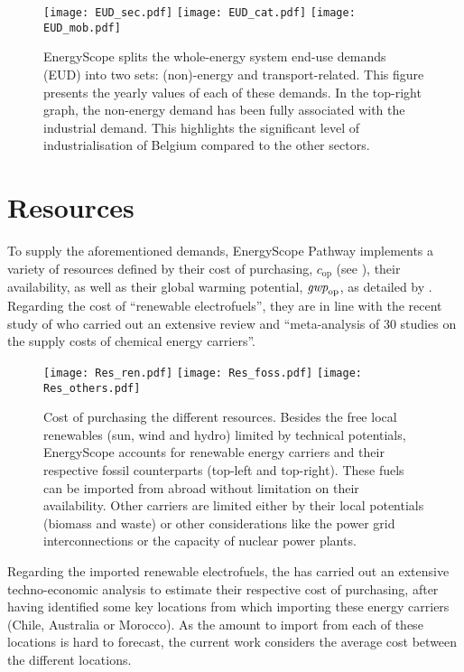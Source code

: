 \begin{figure}[htbp!]
\centering
\texttt{[image: EUD\_sec.pdf]}
\texttt{[image: EUD\_cat.pdf]}
\texttt{[image: EUD\_mob.pdf]}
\caption{EnergyScope splits the whole-energy system end-use demands (EUD) into two sets: (non)-energy and transport-related. This figure presents the yearly values of each of these demands. In the top-right graph, the non-energy demand has been fully associated with the industrial demand. This highlights the significant level of industrialisation of Belgium compared to the other sectors.}
\label{fig:cs_demands}
\end{figure}


\section{Resources}
\label{sec:cs:resources}
To supply the aforementioned demands, EnergyScope Pathway implements a variety of resources defined by their cost of purchasing, $\mathit{c}_{\mathrm{op}}$ (see ), their availability, as well as their global warming potential, $\emph{gwp}_{\mathrm{op}}$, as detailed by \citet{limpens2024pathway}. Regarding the cost of ``renewable electrofuels'', they are in line with the recent study of \citet{genge2023supply} who carried out an extensive review and ``meta-analysis \cite{grant2009typology,page2021prisma} of 30 studies on the supply costs of chemical energy carriers''. 

\begin{figure}[htbp!]
\centering
\texttt{[image: Res\_ren.pdf]}
\texttt{[image: Res\_foss.pdf]}
\texttt{[image: Res\_others.pdf]}
\caption{Cost of purchasing the different resources. Besides the free local renewables (\ie sun, wind and hydro) limited by technical potentials, EnergyScope accounts for renewable energy carriers and their respective fossil counterparts (top-left and top-right). These fuels can be imported from abroad without limitation on their availability. Other carriers are limited either by their local potentials (\ie biomass and waste) or other considerations like the power grid interconnections or the capacity of nuclear power plants.}
\label{fig:cs_resources_cost}
\end{figure}

Regarding the imported renewable electrofuels, the \citet{h2coalition} has carried out an extensive techno-economic analysis to estimate their respective cost of purchasing, after having identified some key locations from which importing these energy carriers (\eg Chile, Australia or Morocco). As the amount to import from each of these locations is hard to forecast, the current work considers the average cost between the different locations. 

